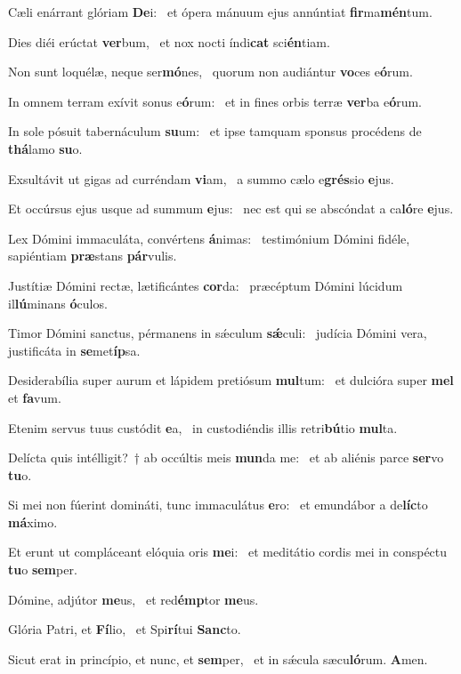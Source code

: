 \item Cæli enárrant glóriam \textbf{De}i:~\psstar{} et ópera mánuum ejus annúntiat \textbf{fir}ma\textbf{mén}tum.
\item Dies diéi erúctat \textbf{ver}bum,~\psstar{} et nox nocti índi\textbf{cat} sci\textbf{én}tiam.
\item Non sunt loquélæ, neque ser\textbf{mó}nes,~\psstar{} quorum non audiántur \textbf{vo}ces e\textbf{ó}rum.
\item In omnem terram exívit sonus e\textbf{ó}rum:~\psstar{} et in fines orbis terræ \textbf{ver}ba e\textbf{ó}rum.
\item In sole pósuit tabernáculum \textbf{su}um:~\psstar{} et ipse tamquam sponsus procédens de \textbf{thá}lamo \textbf{su}o.
\item Exsultávit ut gigas ad curréndam \textbf{vi}am,~\psstar{} a summo cælo e\textbf{grés}sio \textbf{e}jus.
\item Et occúrsus ejus usque ad summum \textbf{e}jus:~\psstar{} nec est qui se abscóndat a ca\textbf{ló}re \textbf{e}jus.
\item Lex Dómini immaculáta, convértens \textbf{á}nimas:~\psstar{} testimónium Dómini fidéle, sapiéntiam \textbf{præ}stans \textbf{pár}vulis.
\item Justítiæ Dómini rectæ, lætificántes \textbf{cor}da:~\psstar{} præcéptum Dómini lúcidum il\textbf{lú}minans \textbf{ó}culos.
\item Timor Dómini sanctus, pérmanens in sǽculum \textbf{sǽ}culi:~\psstar{} judícia Dómini vera, justificáta in \textbf{se}met\textbf{íp}sa.
\item Desiderabília super aurum et lápidem pretiósum \textbf{mul}tum:~\psstar{} et dulcióra super \textbf{mel} et \textbf{fa}vum.
\item Etenim servus tuus custódit \textbf{e}a,~\psstar{} in custodiéndis illis retri\textbf{bú}tio \textbf{mul}ta.
\item Delícta quis intélligit?~† ab occúltis meis \textbf{mun}da me:~\psstar{} et ab aliénis parce \textbf{ser}vo \textbf{tu}o.
\item Si mei non fúerint domináti, tunc immaculátus \textbf{e}ro:~\psstar{} et emundábor a de\textbf{líc}to \textbf{má}ximo.
\item Et erunt ut compláceant elóquia oris \textbf{me}i:~\psstar{} et meditátio cordis mei in conspéctu \textbf{tu}o \textbf{sem}per.
\item Dómine, adjútor \textbf{me}us,~\psstar{} et red\textbf{émp}tor \textbf{me}us.
\item Glória Patri, et \textbf{Fí}lio,~\psstar{} et Spi\textbf{rí}tui \textbf{Sanc}to.
\item Sicut erat in princípio, et nunc, et \textbf{sem}per,~\psstar{} et in sǽcula sæcu\textbf{ló}rum. \textbf{A}men.

